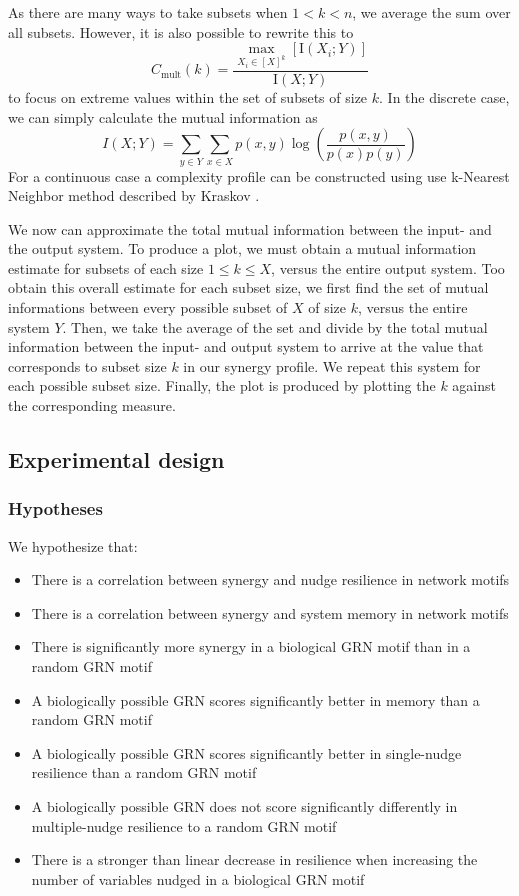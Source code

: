 \documentclass[../main.tex]{subfiles}
\begin{document}
As there are many ways to take subsets when $1 < k < n$, we average the sum over all subsets.
However, it is also possible to rewrite this to
%
\begin{equation}
C_\mathrm{mult}(k) = \frac{\max_{X_i \in [X]^k} [\mathrm{I}(X_i;Y)]}{\mathrm{I}(X;Y)}
\end{equation}
%
to focus on extreme values within the set of subsets of size $k$.
In the discrete case, we can simply calculate the mutual information as
%
\begin{equation}
	I(X;Y) = \sum_{y \in Y} \sum_{x \in X} p(x,y) \log (\frac{p(x,y)}{p(x)p(y)})
\end{equation}
%
For a continuous case a complexity profile can be constructed using use k-Nearest Neighbor method described by Kraskov \cite{kraskov2004estimating}.

We now can approximate the total mutual information between the input- and the output system.
To produce a plot, we must obtain a mutual information estimate for subsets of each size $1 \le k \le X$, versus the entire output system.
Too obtain this overall estimate for each subset size, we first find the set of mutual informations between every possible subset of $X$ of size $k$, versus the entire system $Y$.
Then, we take the average of the set and divide by the total mutual information between the input- and output system to arrive at the value that corresponds to subset size $k$ in our synergy profile.
We repeat this system for each possible subset size.
Finally, the plot is produced by plotting the $k$ against the corresponding measure.

\subsection{Experimental design}

\subsubsection{Hypotheses}

We hypothesize that:

\begin{itemize}
\item There is a correlation between synergy and nudge resilience in network motifs
\item There is a correlation between synergy and system memory in network motifs
\item There is significantly more synergy in a biological GRN motif than in a random GRN motif
\item A biologically possible GRN scores significantly better in memory than a random GRN motif
\item A biologically possible GRN scores significantly better in single-nudge resilience than a random GRN motif
\item A biologically possible GRN does not score significantly differently in multiple-nudge resilience to a random GRN motif
\item There is a stronger than linear decrease in resilience when increasing the number of variables nudged in a biological GRN motif
\end{itemize}
\end{document}
